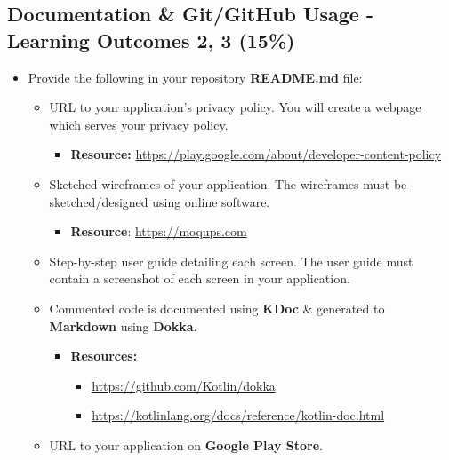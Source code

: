 \documentclass{article}
\begin{document}
\subsection*{Documentation \& Git/GitHub Usage - Learning Outcomes 2, 3 (15\%)}
\begin{itemize}
	\item Provide the following in your repository \textbf{README.md} file:
	      \begin{itemize}
		      \item URL to your application's privacy policy. You will create a webpage which serves your privacy policy.
		      \begin{itemize}
						\item \textbf{Resource:} \footnotesize\href{https://play.google.com/about/developer-content-policy}{https://play.google.com/about/developer-content-policy}
					\end{itemize} 
		      \item Sketched wireframes of your application. The wireframes must be sketched/designed using online software. 
		            \begin{itemize}
			            \item \textbf{Resource}: \footnotesize\href{https://moqups.com}{https://moqups.com}
		            \end{itemize}
		      \item Step-by-step user guide detailing each screen. The user guide must contain a screenshot of each screen in your application.
		      \item Commented code is documented using \textbf{KDoc} \& generated to \textbf{Markdown} using \textbf{Dokka}.
		      \begin{itemize}
						\item \textbf{Resources:}
		            \begin{itemize}
									\item \footnotesize\href{https://github.com/Kotlin/dokka}{https://github.com/Kotlin/dokka}
			            \item \footnotesize\href{https://kotlinlang.org/docs/reference/kotlin-doc.html}{https://kotlinlang.org/docs/reference/kotlin-doc.html}
		            \end{itemize}
					\end{itemize}
		      \item URL to your application on \textbf{Google Play Store}.
	      \end{itemize}
			\end{itemize}
\end{document}

